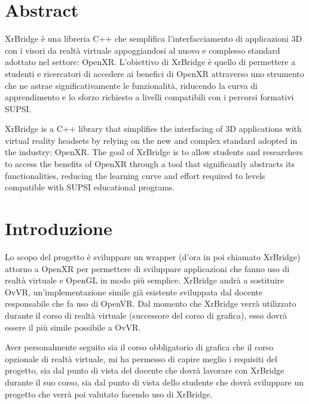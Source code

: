 \documentclass[twoside]{supsistudent}
\begin{document}
\maketitle
\onehalfspacing
\frontmatter

\tableofcontents
\listoffigures					%
\listoftables					%

\newpage
\mainmatter
{}
\setcounter{page}{1}

\chapter{Abstract}

XrBridge è una libreria C++ che semplifica l’interfacciamento di applicazioni 3D con i visori da realtà virtuale appoggiandosi al nuovo e complesso standard adottato nel settore: OpenXR. L’obiettivo di XrBridge è quello di permettere a studenti e ricercatori di accedere ai benefici di OpenXR attraverso uno strumento che ne astrae significativamente le funzionalità, riducendo la curva di apprendimento e lo sforzo richiesto a livelli compatibili con i percorsi formativi SUPSI.\newline

XrBridge is a C++ library that simplifies the interfacing of 3D applications with virtual reality headsets by relying on the new and complex standard adopted in the industry: OpenXR. The goal of XrBridge is to allow students and researchers to access the benefits of OpenXR through a tool that significantly abstracts its functionalities, reducing the learning curve and effort required to levels compatible with SUPSI educational programs.

\chapter{Introduzione}

Lo scopo del progetto è sviluppare un wrapper (d'ora in poi chiamato XrBridge) attorno a OpenXR per permettere di sviluppare applicazioni che fanno uso di realtà virtuale e OpenGL in modo più semplice. XrBridge andrà a sostituire OvVR, un'implementazione simile già esistente sviluppata dal docente responsabile che fa uso di OpenVR. Dal momento che XrBridge verrà utilizzato durante il corso di realtà virtuale (successore del corso di grafica), esso dovrà essere il più simile possibile a OvVR.

Aver personalmente seguito sia il corso obbligatorio di grafica che il corso opzionale di realtà virtuale, mi ha permesso di capire meglio i requisiti del progetto, sia dal punto di vista del docente che dovrà lavorare con XrBridge durante il suo corso, sia dal punto di vista dello studente che dovrà sviluppare un progetto che verrà poi valutato facendo uso di XrBridge.
\end{document}
